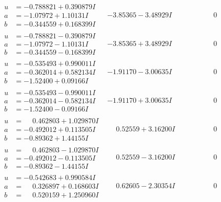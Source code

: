 \documentclass[1p]{elsarticle_modified}
\theoremstyle{definition}
\begin{document}
$$\begin{array}{c|c|c}
 \hline 
\begin{aligned}
u &= -0.788821 + 0.390879 I \\
a &= -1.07972 + 1.10131 I \\
b &= -0.344559 + 0.168399 I\end{aligned}
 & -3.85365 - 3.48929 I & \phantom{-0.000000 } 0 \\ \hline\begin{aligned}
u &= -0.788821 - 0.390879 I \\
a &= -1.07972 - 1.10131 I \\
b &= -0.344559 - 0.168399 I\end{aligned}
 & -3.85365 + 3.48929 I & \phantom{-0.000000 } 0 \\ \hline\begin{aligned}
u &= -0.535493 + 0.990011 I \\
a &= -0.362014 + 0.582134 I \\
b &= -1.52400 + 0.09166 I\end{aligned}
 & -1.91170 - 3.00635 I & \phantom{-0.000000 } 0 \\ \hline\begin{aligned}
u &= -0.535493 - 0.990011 I \\
a &= -0.362014 - 0.582134 I \\
b &= -1.52400 - 0.09166 I\end{aligned}
 & -1.91170 + 3.00635 I & \phantom{-0.000000 } 0 \\ \hline\begin{aligned}
u &= \phantom{-}0.462803 + 1.029870 I \\
a &= -0.492012 + 0.113505 I \\
b &= -0.89362 + 1.44155 I\end{aligned}
 & \phantom{-}0.52559 + 3.16200 I & \phantom{-0.000000 } 0 \\ \hline\begin{aligned}
u &= \phantom{-}0.462803 - 1.029870 I \\
a &= -0.492012 - 0.113505 I \\
b &= -0.89362 - 1.44155 I\end{aligned}
 & \phantom{-}0.52559 - 3.16200 I & \phantom{-0.000000 } 0 \\ \hline\begin{aligned}
u &= -0.542683 + 0.990584 I \\
a &= \phantom{-}0.326897 + 0.168603 I \\
b &= \phantom{-}0.520159 + 1.250960 I\end{aligned}
 & \phantom{-}0.62605 - 2.30354 I & \phantom{-0.000000 } 0 \\ \hline\begin{aligned}

\end{aligned}
\end{array}$$
\end{document}
